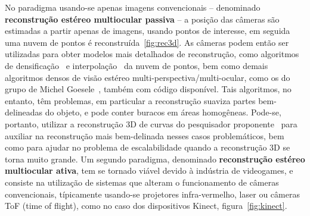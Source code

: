 No paradigma usando-se apenas imagens convencionais -- denominado
\textbf{reconstrução estéreo multiocular passiva} --  a posição das câmeras são
estimadas a partir apenas de imagens, usando pontos de interesse, em seguida uma
nuvem de pontos é reconstruída~\ref{fig:rec3d}.
As câmeras podem então ser utilizadas para obter modelos mais detalhados de reconstrução, como algoritmos de densificação~\cite{furukawa2007dense} e interpolação~\cite{poisson} da nuvem de pontos, bem como demais algoritmos densos de visão estéreo multi-perspectiva/multi-ocular, como os do grupo de Michel Goesele~\cite{mve}, também com código disponível. Tais algoritmos, no entanto, têm problemas, em particular a reconstrução suaviza partes bem-delineadas do objeto, e pode conter buracos em áreas homogêneas. Pode-se, portanto, utilizar a reconstrução 3D de curvas do pesquisador proponente~\cite{Usumezbas:Fabbri:Kimia:ECCV16,Fabbri:Kimia:IJCV2016,Fabbri:Kimia:CVPR10,Fabbri:Giblin:Kimia:ECCV12} para auxiliar na reconstrução mais bem-delinada nesses casos problemáticos, bem como para ajudar
no problema de escalabilidade quando a reconstrução 3D se torna muito grande.
Um segundo paradigma, denominado \textbf{reconstrução estéreo multiocular
ativa}, tem se tornado viável devido à indústria de videogames, e consiste na
utilização de sistemas que alteram o funcionamento de câmeras convencionais,
típicamente usando-se projetores infra-vermelho, laser ou câmeras ToF (time of
flight), como no caso dos dispositivos Kinect, figura~\ref{fig:kinect}.

